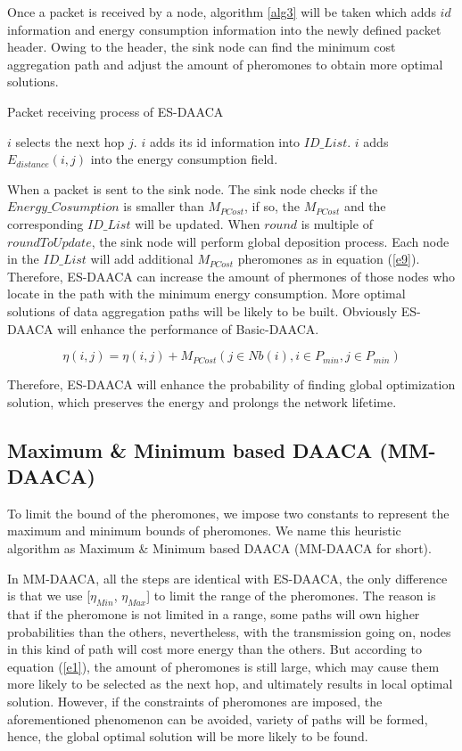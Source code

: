 \documentclass{elsarticle}
\begin{document}
Once a packet is received by a node, algorithm \ref{alg3} will be taken which adds $id$ information and energy consumption information into the newly defined packet header. Owing to the header, the sink node can find the minimum cost aggregation path and adjust the amount of pheromones to obtain more optimal solutions.
\begin{algorithm}
\caption{Packet receiving process of ES-DAACA} \label{alg3}
\begin{algorithmic}[1]
 \label{alg3Starts}
\STATE $i$ selects the next hop $j$.
\STATE $i$ adds its id information into $ID\_List$.
\STATE $i$ adds $E_{distance}(i,j)$ into the energy consumption field. \label{alg3Ends}
\ENDIF
\end{algorithmic}
\end{algorithm}

When a packet is sent to the sink node. The sink node checks if the $Energy\_Cosumption$ is smaller than $M_{PCost}$, if so, the $M_{PCost}$ and the corresponding $ID\_List$ will be updated. When $round$ is multiple of $roundToUpdate$, the sink node will perform global deposition process. Each node in the $ID\_List$ will add additional $M_{PCost}$ pheromones as in equation (\ref{e9}). Therefore, ES-DAACA can increase the amount of phermones of those nodes who locate in the path with the minimum energy consumption. More optimal solutions of data aggregation paths will be likely to be built. Obviously ES-DAACA will enhance the performance of Basic-DAACA.

\begin{equation}
\eta(i,j)= \eta(i,j) + M_{PCost} (j \in Nb(i), i \in P_{min}, j \in P_{min}) \label{e9}
\end{equation}

Therefore, ES-DAACA will enhance the probability of finding global optimization solution, which preserves the energy and prolongs the network lifetime.

\subsection{Maximum \& Minimum based DAACA (MM-DAACA)} \label{MMDAACA}
To limit the bound of the pheromones, we impose two constants to represent the maximum and minimum bounds of pheromones. We name this heuristic algorithm as Maximum \& Minimum based DAACA (MM-DAACA for short).


In MM-DAACA, all the steps are identical with ES-DAACA, the only difference is that we use [$\eta_{Min}$, $\eta_{Max}$] to limit the range of the pheromones. The reason is that if the pheromone is not limited in a range, some paths will own higher probabilities than the others, nevertheless, with the transmission going on, nodes in this kind of path will cost more energy than the others. But according to equation (\ref{e1}), the amount of pheromones is still large, which may cause them more likely to be selected as the next hop, and ultimately results in local optimal solution. However, if the constraints of pheromones are imposed, the aforementioned phenomenon can be avoided, variety of paths will be formed, hence, the global optimal solution will be more likely to be found.
\end{document}
